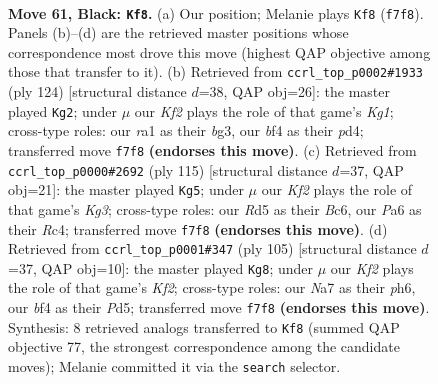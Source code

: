 \documentclass[11pt]{article}
\begin{document}
\clearpage

\begin{figure}[p]\centering
\begin{subfigure}{0.46\textwidth}\centering
\resizebox{\linewidth}{!}{%
\newchessgame
\chessboard[
  setfen={7K/n1P2k2/p7/P2r1p1p/4pBb1/6P1/8/RN6 b - - 29 61},
  showmover=false,
  pgfstyle=straightmove, color=movearrow, markmove={f7-f8}
]}
\caption{}
\end{subfigure}\hfill
\begin{subfigure}{0.46\textwidth}\centering
\resizebox{\linewidth}{!}{%
\newchessgame
\chessboard[
  setfen={3r4/2p2k1p/1p6/pP6/P2pB3/3P2b1/2R1P3/6K1 w - - 0 63},
  showmover=false,
  pgfstyle=straightmove, color=movearrow, markmove={g1-g2}
]}
\caption{}
\end{subfigure}
\\[4pt]
\begin{subfigure}{0.46\textwidth}\centering
\resizebox{\linewidth}{!}{%
\newchessgame
\chessboard[
  setfen={8/1p6/p1b3k1/4B3/2r4p/P4P2/1P1R1K1P/8 b - - 26 58},
  showmover=false,
  pgfstyle=straightmove, color=movearrow, markmove={g6-g5}
]}
\caption{}
\end{subfigure}\hfill
\begin{subfigure}{0.46\textwidth}\centering
\resizebox{\linewidth}{!}{%
\newchessgame
\chessboard[
  setfen={8/5k2/4p2P/2ppP3/N1b5/Pp6/1P1K3R/1r6 b - - 0 53},
  showmover=false,
  pgfstyle=straightmove, color=movearrow, markmove={f7-g8}
]}
\caption{}
\end{subfigure}
\caption{\textbf{Move 61, Black: \texttt{Kf8}.} (a) Our position; Melanie plays \texttt{Kf8} (\texttt{f7f8}). Panels (b)--(d) are the retrieved master positions whose correspondence most drove this move (highest QAP objective among those that transfer to it). (b) Retrieved from \texttt{ccrl\_top\_p0002\#1933} (ply 124) [structural distance $d$=38, QAP obj=26]: the master played \texttt{Kg2}; under $\mu$ our \emph{Kf2} plays the role of that game's \emph{Kg1}; cross-type roles: our \emph{r}a1 as their \emph{b}g3, our \emph{b}f4 as their \emph{p}d4; transferred move \texttt{f7f8} \textbf{(endorses this move)}. (c) Retrieved from \texttt{ccrl\_top\_p0000\#2692} (ply 115) [structural distance $d$=37, QAP obj=21]: the master played \texttt{Kg5}; under $\mu$ our \emph{Kf2} plays the role of that game's \emph{Kg3}; cross-type roles: our \emph{R}d5 as their \emph{B}c6, our \emph{P}a6 as their \emph{R}c4; transferred move \texttt{f7f8} \textbf{(endorses this move)}. (d) Retrieved from \texttt{ccrl\_top\_p0001\#347} (ply 105) [structural distance $d$=37, QAP obj=10]: the master played \texttt{Kg8}; under $\mu$ our \emph{Kf2} plays the role of that game's \emph{Kf2}; cross-type roles: our \emph{N}a7 as their \emph{p}h6, our \emph{b}f4 as their \emph{P}d5; transferred move \texttt{f7f8} \textbf{(endorses this move)}. Synthesis: 8 retrieved analogs transferred to \texttt{Kf8} (summed QAP objective 77, the strongest correspondence among the candidate moves); Melanie committed it via the \texttt{search} selector.}
\label{fig:thought-m121}
\end{figure}
\end{document}
